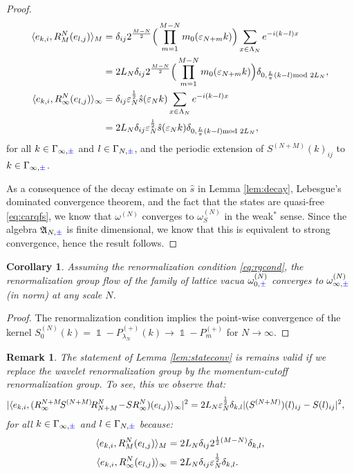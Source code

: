 \documentclass[a4paper, 11pt]{article}
\newcommand{\fA}{\mathfrak{A}}\newcommand{\cA}{\mathcal{A}}\newcommand{\dA}{\mathds{A}}\newcommand{\sA}{\mathscr{A}}
\DeclareMathOperator{\1}{\mathds{1}}
\newtheorem{cor}[thm]{Corollary}
\newtheorem{rem}[thm]{Remark}
\begin{document}
\begin{proof}
\begin{align}
\label{eq:waveletrginner}
\langle e_{k,i},R^{N}_{M}(e_{l,j})\rangle_{M} & = \delta_{ij}2^{\frac{M-N}{2}}\Big(\prod_{m=1}^{M-N}m_{0}(\vep_{N+m}k)\Big)\sum_{x\in\Lambda_{N}}e^{-i(k-l)x} \\ \nonumber
& = 2L_{N}\delta_{ij}2^{\frac{M-N}{2}}\Big(\prod_{m=1}^{M-N}m_{0}(\vep_{N+m}k)\Big)\delta_{0,\frac{L}{\pi}(k-l)\!\!\!\!\mod 2L_{N}}, \\ \nonumber
\langle e_{k,i},R^{N}_{\infty}(e_{l,j})\rangle_{\infty} & = \delta_{ij}\vep_{N}^{\frac{1}{2}}\hat{s}(\vep_{N}k)\sum_{x\in\Lambda_{N}}e^{-i(k-l)x} \\ \nonumber
& = 2L_{N}\delta_{ij}\vep_{N}^{\frac{1}{2}}\hat{s}(\vep_{N}k)\delta_{0,\frac{L}{\pi}(k-l)\!\!\!\!\mod 2L_{N}},
\end{align}
for all $k\in\Gamma_{\infty,{\color{blue}\pm}}$ and $l\in\Gamma_{N,{\color{blue}\pm}}$, and the periodic extension of $S^{(N+M)}(k)_{ij}$ to $k\in\Gamma_{\infty,{\color{blue}\pm}}$.

As a consequence of the decay estimate on $\hat{s}$ in Lemma \ref{lem:decay}, Lebesgue's dominated convergence theorem, and the fact that the states are quasi-free \eqref{eq:carqfs}, we know that $\omega^{(N)}$ converges to $\omega^{(N)}_{S}$ in the weak$^{*}$ sense. Since the algebra $\fA_{N,{\color{blue}\pm}}$ is finite dimensional, we know that this is equivalent to strong convergence, hence the result follows.
\end{proof}

\begin{cor}
\label{cor:stateconv}
Assuming the renormalization condition \eqref{eq:rgcond}, the renormalization group flow of the family of lattice vacua $\omega^{(N)}_{0,{\color{blue}\pm}}$ converges to $\omega^{(N)}_{\infty,{\color{blue}\pm}}$ (in norm) at any scale $N$.
\end{cor}
\begin{proof}
The renormalization condition implies the point-wise convergence of the kernel $S^{(N)}_{0}(k) = \1-P^{(+)}_{\lambda_{N}}(k) \rightarrow \1 - P^{(+)}_{m}$ for $N\rightarrow\infty$.
\end{proof}

\begin{rem}
\label{rem:stateconv}
The statement of Lemma \ref{lem:stateconv} is remains valid if we replace the wavelet renormalization group by the momentum-cutoff renormalization group. To see, this we observe that:
\begin{align*}
|\langle e_{k,i},(R^{N+M}_{\infty}\!S^{(N+M)}\!R^{N}_{N+M}\!-\!SR^{N}_{\infty})(e_{l,j})\rangle_{\infty}|^{2} & = 2L_{N}\varepsilon_{N}^{\frac{1}{2}}\delta_{k,l}|(S^{(N+M)})(l)_{ij}-S(l)_{ij}|^{2},
\end{align*}
for all $k\in\Gamma_{\infty,{\color{blue}\pm}}$ and $l\in\Gamma_{N,{\color{blue}\pm}}$ because:
\begin{align}
\label{eq:momrginner}
\langle e_{k,i},R^{N}_{M}(e_{l,j})\rangle_{M} & = 2L_{N}\delta_{ij}2^{\frac{1}{2}(M-N)}\delta_{k,l}, \\ \nonumber
\langle e_{k,i},R^{N}_{\infty}(e_{l,j})\rangle_{\infty} & = 2L_{N}\delta_{ij}\varepsilon_{N}^{\frac{1}{2}}\delta_{k,l}.
\end{align}
\end{rem}
\end{document}
